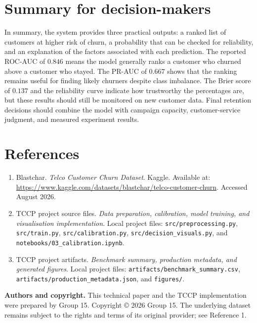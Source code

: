\documentclass[9pt]{article}
\begin{document}
\section*{Summary for decision-makers}
In summary, the system provides three practical outputs: a ranked list of customers at higher risk of churn, a probability that can be checked for reliability, and an explanation of the factors associated with each prediction. The reported ROC-AUC of $0.846$ means the model generally ranks a customer who churned above a customer who stayed. The PR-AUC of $0.667$ shows that the ranking remains useful for finding likely churners despite class imbalance. The Brier score of $0.137$ and the reliability curve indicate how trustworthy the percentages are, but these results should still be monitored on new customer data. Final retention decisions should combine the model with campaign capacity, customer-service judgment, and measured experiment results.

\section*{References}
\begin{enumerate}[leftmargin=*]
\item Blastchar. \textit{Telco Customer Churn Dataset}. Kaggle. Available at: \href{https://www.kaggle.com/datasets/blastchar/telco-customer-churn}{https://www.kaggle.com/datasets/blastchar/telco-customer-churn}. Accessed August 2026.
\item TCCP project source files. \textit{Data preparation, calibration, model training, and visualisation implementation}. Local project files: \texttt{src/preprocessing.py}, \texttt{src/train.py}, \texttt{src/calibration.py}, \texttt{src/decision\_visuals.py}, and \texttt{notebooks/03\_calibration.ipynb}.
\item TCCP project artifacts. \textit{Benchmark summary, production metadata, and generated figures}. Local project files: \texttt{artifacts/benchmark\_summary.csv}, \texttt{artifacts/production\_metadata.json}, and \texttt{figures/}.
\end{enumerate}

\vspace{0.3cm}
\textbf{Authors and copyright.} This technical paper and the TCCP implementation were prepared by Group 15. Copyright \copyright{} 2026 Group 15. The underlying dataset remains subject to the rights and terms of its original provider; see Reference 1.

\newpage
\end{document}
